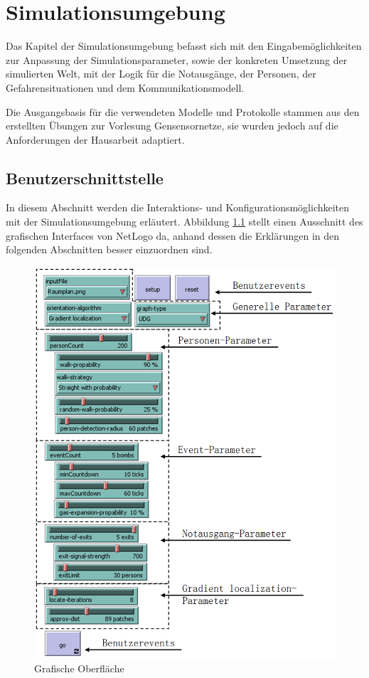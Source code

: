 \chapter{Simulationsumgebung}
\label{cha:simulationsumgebung}

Das Kapitel der Simulationsumgebung befasst sich mit den Eingabemöglichkeiten zur Anpassung der Simulationsparameter, sowie der konkreten Umsetzung der simulierten Welt, mit der Logik für die Notausgänge, der Personen, der Gefahrensituationen und dem Kommunikationsmodell.

Die Ausgangsbasis für die verwendeten Modelle und Protokolle stammen aus den erstellten Übungen zur Vorlesung Gensensornetze, sie wurden jedoch auf die Anforderungen der Hausarbeit adaptiert.

\section{Benutzerschnittstelle}
\label{sec:benutzerschnittstelle}

In diesem Abschnitt werden die Interaktions- und Konfigurationsmöglichkeiten mit der Simulationsumgebung erläutert. Abbildung \ref{fig:gui} stellt einen Ausschnitt des grafischen Interfaces von NetLogo da, anhand dessen die Erklärungen in den folgenden Abschnitten besser einzuordnen sind. 

\begin{figure}[!ht]
\centering
\includegraphics[height=0.85\textwidth]{simulationsumgebung/gui_3}
\caption{Grafische Oberfläche}
\label{fig:gui}
\end{figure}

